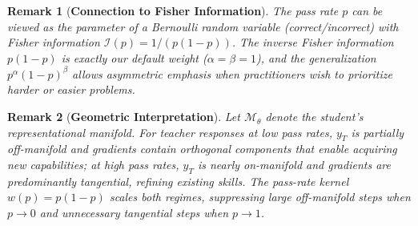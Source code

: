 \documentclass{article}
\newtheorem{remark}{Remark}
\begin{document}
\begin{remark}[\textbf{Connection to Fisher Information}]
\label{rem:fisher}
The pass rate $p$ can be viewed as the parameter of a Bernoulli random variable (correct/incorrect) with Fisher information $\mathcal{I}(p) = 1/(p(1-p))$. The inverse Fisher information $p(1-p)$ is exactly our default weight ($\alpha = \beta = 1$), and the generalization $p^\alpha(1-p)^\beta$ allows asymmetric emphasis when practitioners wish to prioritize harder or easier problems.
\end{remark}

\begin{remark}[\textbf{Geometric Interpretation}]
\label{rem:geometric}
Let $\mathcal{M}_\theta$ denote the student's representational manifold. For teacher responses at low pass rates, $y_T$ is partially off-manifold and gradients contain orthogonal components that enable acquiring new capabilities; at high pass rates, $y_T$ is nearly on-manifold and gradients are predominantly tangential, refining existing skills. The pass-rate kernel $w(p) = p(1-p)$ scales both regimes, suppressing large off-manifold steps when $p \to 0$ and unnecessary tangential steps when $p \to 1$.
\end{remark}
\end{document}
